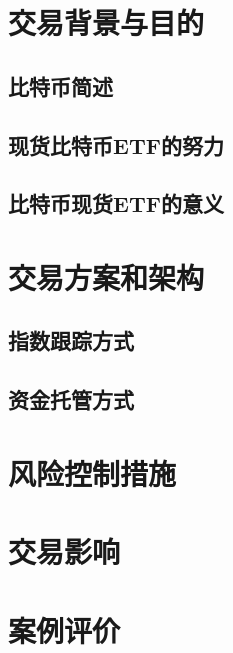 \documentclass[a4paper,12pt]{ctexart}
\begin{document}
\section{交易背景与目的}
\subsection{比特币简述}
\subsection{现货比特币ETF的努力}
\subsection{比特币现货ETF的意义}

\section{交易方案和架构}
\subsection{指数跟踪方式}
\subsection{资金托管方式}

\section{风险控制措施}

\section{交易影响}

\section{案例评价}

\nocite{*}
\printbibliography
\end{document}
